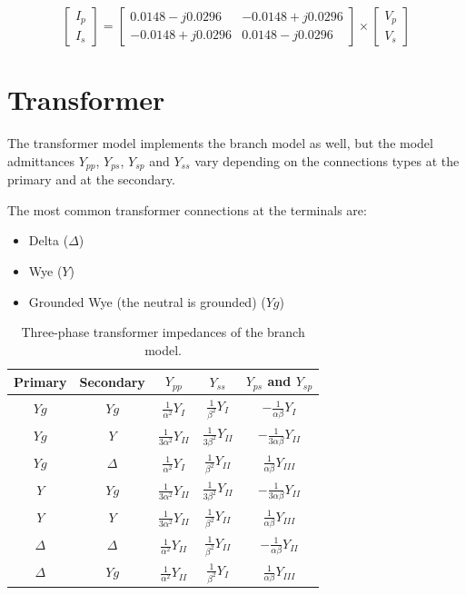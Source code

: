 \documentclass[a4paper,twoside]{tufte-book}
\begin{document}
$$
\left[\begin{array}{c}
I_p \\
I_s
\end{array}\right] = \left[\begin{array}{cc}
0.0148 -j0.0296 & -0.0148 +j0.0296\\
-0.0148 +j0.0296 & 0.0148 -j0.0296
\end{array}\right] \times \left[\begin{array}{c}
V_p \\
V_s
\end{array}\right]
$$

\newpage
\section{Transformer}

The transformer model implements the branch model as well, but the model admittances $Y_{pp}$, $Y_{ps}$, $Y_{sp}$ and $Y_{ss}$ vary depending on the connections types at the primary and at the secondary.

The most common transformer connections at the terminals are:

\begin{itemize}
\item Delta ($\Delta$)
\item Wye ($Y$)
\item Grounded Wye (the neutral is grounded) ($Yg$)
\end{itemize}




\begin{table}[h!]
\begin{center}
\begin{tabular}{ccccc}
\toprule
Primary & Secondary & $Y_{pp}$  & $Y_{ss}$ & $Y_{ps}$ and $Y_{sp}$\\
\midrule
 $Yg$ & $Yg$ 			& $\frac{1}{\alpha^2}Y_I$ 				& $\frac{1}{\beta^2}Y_I$ 		& $-\frac{1}{\alpha\beta}Y_I$\\
 $Yg$ & $Y$ 			& $\frac{1}{3\alpha^2}Y_{II}$			& $\frac{1}{3\beta^2}Y_{II}$	& $-\frac{1}{3\alpha\beta}Y_{II}$	\\
 $Yg$ & $\Delta$  		& $\frac{1}{\alpha^2}Y_I$ 				& $\frac{1}{\beta^2}Y_{II}$ 	& $\frac{1}{\alpha\beta}Y_{III}$	 \\
 $Y$ & $Yg$ 			& $\frac{1}{3\alpha^2}Y_{II}$			& $\frac{1}{3\beta^2}Y_{II}$	& $-\frac{1}{3\alpha\beta}Y_{II}$ \\
 $Y$ & $Y$  			& $\frac{1}{3\alpha^2}Y_{II}$			& $\frac{1}{\beta^2}Y_{II}$ 	& $\frac{1}{\alpha\beta}Y_{III}$	 \\
 $\Delta$ & $\Delta$ 	& $\frac{1}{\alpha^2}Y_{II}$			& $\frac{1}{\beta^2}Y_{II}$		& $-\frac{1}{\alpha\beta}Y_{II}$\\
 $\Delta$ & $Yg$ 		& $\frac{1}{\alpha^2}Y_{II}$			& $\frac{1}{\beta^2}Y_{I}$		& $\frac{1}{\alpha\beta}Y_{III}$\\
\bottomrule
\end{tabular}
\end{center}
  \caption{Three-phase transformer impedances of the branch model.}
  \label{transfoemer_impedances_table}
\end{table}
\end{document}
